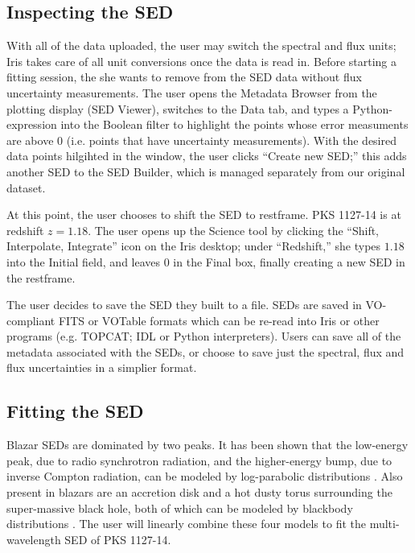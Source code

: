 \documentclass[5p]{elsarticle}
\begin{document}
\subsection{Inspecting the SED}
\label{subsec:inspect-sed}

With all of the data uploaded, the user may switch the spectral and flux units; Iris takes care of all unit conversions once the data is read in. Before starting a fitting session, the she wants to remove from the SED data without flux uncertainty measurements. The user opens the Metadata Browser from the plotting display (SED Viewer), switches to the Data tab, and types a Python-expression into the Boolean filter to highlight the points whose error measuments are above 0 (i.e. points that have uncertainty measurements). With the desired data points hilgihted in the window, the user clicks ``Create new SED;'' this adds another SED to the SED Builder, which is managed separately from our original dataset.

At this point, the user chooses to shift the SED to restframe. PKS 1127-14 is at redshift $z=1.18$. The user opens up the Science tool by clicking the ``Shift, Interpolate, Integrate'' icon on the Iris desktop; under ``Redshift,'' she types $1.18$ into the Initial field, and leaves 0 in the Final box, finally creating a new SED in the restframe.

The user decides to save the SED they built to a file. SEDs are saved in VO-compliant FITS or VOTable formats which can be re-read into Iris or other programs (e.g. TOPCAT; IDL or Python interpreters). Users can save all of the metadata associated with the SEDs, or choose to save just the spectral, flux and flux uncertainties in a simplier format.

\subsection{Fitting the SED}

Blazar SEDs are dominated by two peaks. It has been shown that the low-energy peak, due to radio synchrotron radiation, and the higher-energy bump, due to inverse Compton radiation, can be modeled by log-parabolic distributions \citep{2006A&A...448..861M,2009A&A...501..879T}. Also present in blazars are an accretion disk and a hot dusty torus surrounding the super-massive black hole, both of which can be modeled by blackbody distributions \citep{2002ApJ...575..667D}. The user will linearly combine these four models to fit the multi-wavelength SED of PKS 1127-14.  
\end{document}
